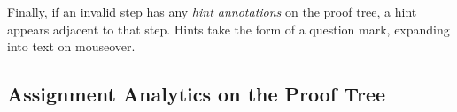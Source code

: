 \documentclass{sigchi}
\begin{document}
Finally, if an invalid step has any \textit{hint annotations} on the proof tree, a hint appears adjacent to that step. Hints take the form of a question mark, expanding into text on mouseover.

% 
% 
% 
% 
% 

\subsection{Assignment Analytics on the Proof Tree}
\end{document}

